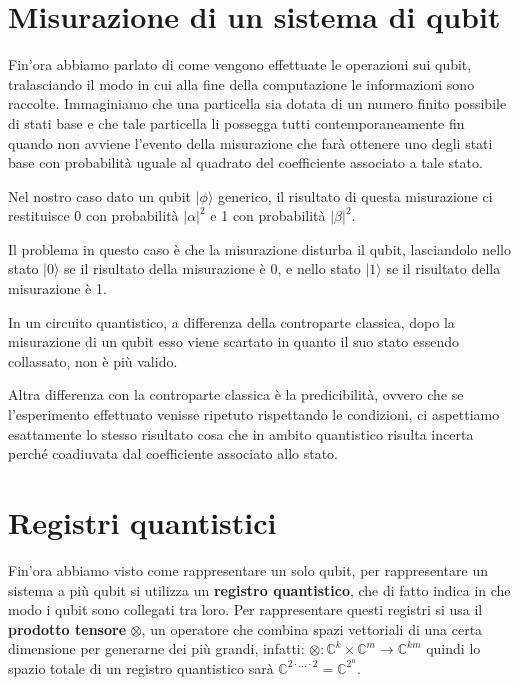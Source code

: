\section{Misurazione di un sistema di qubit}
Fin'ora abbiamo parlato di come vengono effettuate le operazioni sui qubit, tralasciando il modo in cui alla fine della computazione le informazioni sono raccolte. Immaginiamo che una particella sia dotata di un numero finito possibile di stati base e che tale particella li possegga tutti contemporaneamente fin quando non avviene l'evento della misurazione che farà ottenere uno degli stati base con probabilità uguale al quadrato del coefficiente associato a tale stato.

Nel nostro caso dato un qubit \(| \phi \rangle \) generico, il risultato di questa misurazione ci restituisce 0 con probabilità \( |\alpha|^2 \) e 1 con probabilità \( |\beta|^2 \).

Il problema in questo caso è che la misurazione disturba il qubit, lasciandolo nello stato \( | 0 \rangle \)  se il risultato della misurazione è 0, e nello stato \( | 1 \rangle \)  se il risultato della misurazione è 1.

In un circuito quantistico, a differenza della controparte classica, dopo la misurazione di un qubit esso viene scartato in quanto il suo stato essendo collassato, non è più valido.

Altra differenza con la controparte classica è la predicibilità, ovvero che se l'esperimento effettuato venisse ripetuto rispettando le condizioni, ci aspettiamo esattamente lo stesso risultato cosa che in ambito quantistico risulta incerta perché coadiuvata dal coefficiente associato allo stato.

\section{Registri quantistici}
Fin'ora abbiamo visto come rappresentare un solo qubit, per rappresentare un sistema a più qubit si utilizza un \textbf{registro quantistico}, che di fatto indica in che modo i qubit sono collegati tra loro. Per rappresentare questi registri si usa il \textbf{prodotto tensore} \( \otimes \), un operatore che combina spazi vettoriali di una certa dimensione per generarne dei più grandi, infatti: \( \otimes: \mathbb{C}^k \times \mathbb{C}^m \rightarrow \mathbb{C}^{km} \) quindi lo spazio totale di un registro quantistico sarà \( \mathbb{C}^{2 \cdot...\cdot 2} = \mathbb{C}^{2^n} \).


